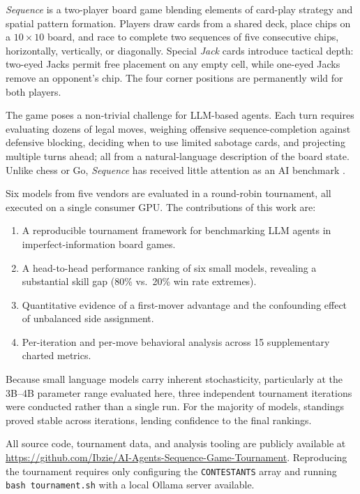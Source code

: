 \documentclass[11pt]{article}
\begin{document}
\textit{Sequence} is a two-player board game blending elements of card-play strategy and spatial pattern formation. Players draw cards from a shared deck, place chips on a $10 \times 10$ board, and race to complete two sequences of five consecutive chips, horizontally, vertically, or diagonally. Special \textit{Jack} cards introduce tactical depth: two-eyed Jacks permit free placement on any empty cell, while one-eyed Jacks remove an opponent's chip. The four corner positions are permanently wild for both players.

The game poses a non-trivial challenge for LLM-based agents. Each turn requires evaluating dozens of legal moves, weighing offensive sequence-completion against defensive blocking, deciding when to use limited sabotage cards, and projecting multiple turns ahead; all from a natural-language description of the board state. Unlike chess or Go, \textit{Sequence} has received little attention as an AI benchmark \cite{llm_games}.

Six models from five vendors are evaluated in a round-robin tournament, all executed on a single consumer GPU. The contributions of this work are:

\begin{enumerate}[nosep]
\item A reproducible tournament framework for benchmarking LLM agents in imperfect-information board games.
\item A head-to-head performance ranking of six small models, revealing a substantial skill gap (80\% vs.\ 20\% win rate extremes).
\item Quantitative evidence of a first-mover advantage and the confounding effect of unbalanced side assignment.
\item Per-iteration and per-move behavioral analysis across 15 supplementary charted metrics.
\end{enumerate}

Because small language models carry inherent stochasticity, particularly at the 3B--4B parameter range evaluated here, three independent tournament iterations were conducted rather than a single run. For the majority of models, standings proved stable across iterations, lending confidence to the final rankings.

All source code, tournament data, and analysis tooling are publicly available at \url{https://github.com/Ibzie/AI-Agents-Sequence-Game-Tournament}. Reproducing the tournament requires only configuring the \texttt{CONTESTANTS} array and running \texttt{bash tournament.sh} with a local Ollama server available.
\end{document}
